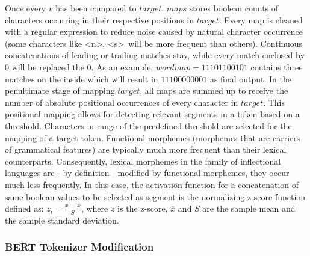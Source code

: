 Once every $v$ has been compared to $target$, $maps$ stores boolean counts of characters occurring in their respective positions in $target$.
Every map is cleaned with a regular expression to reduce noise caused by natural character occurrence (some characters like \textless n\textgreater, \textless s\textgreater ~will be more frequent than others).
Continuous concatenations of leading or trailing matches stay, while every match enclosed by $0$ will be replaced the $0$.
As an example, $wordmap = 11101100101$ contains three matches on the inside which will result in $11100000001$ as final output.
In the penultimate stage of mapping $target$, all maps are summed up to receive the number of absolute positional occurrences of every character in $target$.
This positional mapping allows for detecting relevant segments in a token based on a threshold.
Characters in range of the predefined threshold are selected for the mapping of a target token.
Functional morphemes (morphemes that are carriers of grammatical features) are typically much more frequent than their lexical counterparts.
Consequently, lexical morphemes in the family of inflectional languages are - by definition - modified by functional morphemes, they occur much less frequently.
In this case, the activation function for a concatenation of same boolean values to be selected as segment is the normalizing z-score function defined as: $z_{i} = \frac{x_{i} - \overline{x}}{S}$,
where $z$ is the z-score, $\overline{x}$ and $S$ are the sample mean and the sample standard deviation.


\subsubsection{BERT Tokenizer Modification}
\label{subsubsec:tokenizer-modification}


